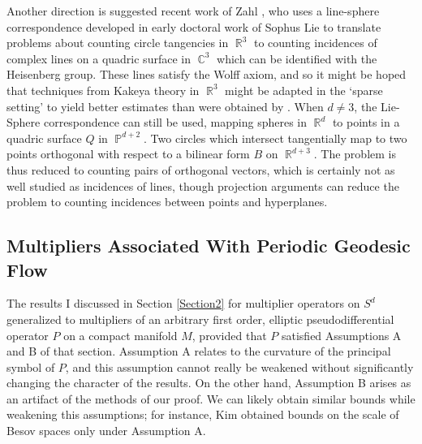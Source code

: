 \documentclass[11pt]{article}
\DeclareMathOperator{\RR}{\mathbb{R}}
\DeclareMathOperator{\CC}{\mathbb{C}}
\DeclareMathOperator{\PP}{\mathbb{P}}
\begin{document}

Another direction is suggested recent work of Zahl \cite{ZahlLieSphere}, who uses a line-sphere correspondence developed in early doctoral work of Sophus Lie to translate problems about counting circle tangencies in $\RR^3$ to counting incidences of complex lines on a quadric surface in $\CC^3$ which can be identified with the Heisenberg group. These lines satisfy the Wolff axiom, and so it might be hoped that techniques from Kakeya theory in $\RR^3$ might be adapted in the `sparse setting' to yield better estimates than were obtained by \cite{Cladek}. When $d \neq 3$, the Lie-Sphere correspondence can still be used, mapping spheres in $\RR^d$ to points in a quadric surface $Q$ in $\PP^{d+2}$. Two circles which intersect tangentially map to two points orthogonal with respect to a bilinear form $B$ on $\RR^{d+3}$. The problem is thus reduced to counting pairs of orthogonal vectors, which is certainly not as well studied as incidences of lines, though projection arguments can reduce the problem to counting incidences between points and hyperplanes.

\subsection{Multipliers Associated With Periodic Geodesic Flow}

The results I discussed in Section \ref{Section2} for multiplier operators on $S^d$ generalized to multipliers of an arbitrary first order, elliptic pseudodifferential operator $P$ on a compact manifold $M$, provided that $P$ satisfied Assumptions A and B of that section. Assumption A relates to the curvature of the principal symbol of $P$, and this assumption cannot really be weakened without significantly changing the character of the results. On the other hand, Assumption B arises as an artifact of the methods of our proof. We can likely obtain similar bounds while weakening this assumptions; for instance, Kim \cite{KimManifold} obtained bounds on the scale of Besov spaces only under Assumption A.
\end{document}
